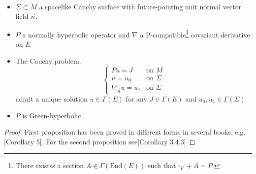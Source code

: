 \documentclass[Main]{subfiles}
\begin{document}
	\begin{theorem}
	$ $
		\begin{hypothesis}
			\begin{itemize}
				\item $\Sigma \subset M$ a spacelike Cauchy surface with future-pointing unit normal vector field $\vec{n}$.
				\item $P$ a normally hyperbolic operator and $\nabla$ a P-compatible\footnote{There existss a section $A \in \Gamma(\textrm{End}(E))$ such that $\square_\nabla + A = P$.} covariant derivative on $E$
			\end{itemize}
		\end{hypothesis}
	\begin{thesis}
		\begin{itemize}
			\item The Cauchy problem;
				\begin{displaymath}
					\begin{cases} 
						P u = J & \textrm{on $M$} \\ 
						u = u_0 & \textrm{on $\Sigma$}\\ 
						\nabla_{\vec{n}}u= u_1  & \textrm{on $\Sigma$}
					\end{cases}
				\end{displaymath}
				admit a unique solution $u\in \Gamma(E)$ for any $J\in \Gamma(E)$ and $ u_0,u_1 \in \Gamma(\Sigma)$
			\item $P$ is Green-hyperbolic.
		\end{itemize}
	\end{thesis}
	\end{theorem}	
	\begin{proof}
		First proposition has been proved in different forms in several books, e.g. \cite{Bar2009}[Corollary 5].
		For the second proposition see\cite{Baer2008}[Corollary 3.4.3]
	\end{proof}
	
				
\end{document}
